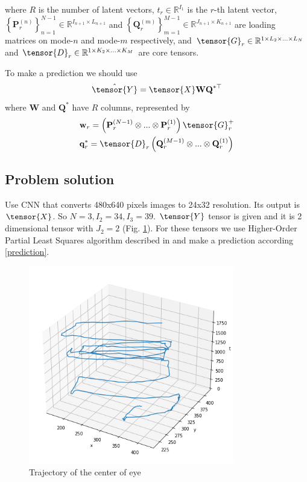 \documentclass[../../main.tex]{subfiles}
\begin{document}
\noindent where $R$ is the number of latent vectors, $t_r \in \mathbb{R}^{I_1}$ is the $r$-th latent vector, $\left\{\textbf{P}_r^{(n)}\right\}_{n=1}^{N-1} \in \mathbb{R}^{I_{n+1} \times L_{n+1}}$ and 
$\left\{\textbf{Q}_r^{(m)}\right\}_{m=1}^{M-1} \in \mathbb{R}^{J_{n+1} \times K_{n+1}}$
are loading matrices on mode-$n$ and mode-$m$ respectively, and $\tensor{G}_r \in \mathbb{R}^{1 \times L_2 \times ... \times L_N}$ and $\tensor{D}_r \in \mathbb{R}^{1 \times K_2 \times ... \times K_M}$ are core tensors.

To make a prediction we should use 
\begin{equation}
    \label{prediction}
    \hat{\tensor{Y}} = \tensor{X} \textbf{W} \textbf{Q}^{* \top}
\end{equation}
where $\textbf{W}$ and $\textbf{Q}^{*}$ have $R$ columns, represented by
\begin{equation}
    \begin{split}
        & \textbf{w}_r = \left( \textbf{P}_r^{(N-1)} \otimes ... \otimes \textbf{P}_r^{(1)} \right) \tensor{G}_{r}^+ \\
        & \textbf{q}^*_r = \tensor{D}_{r} \left( \textbf{Q}_r^{(M-1)} \otimes ... \otimes \textbf{Q}_r^{(1)} \right)
    \end{split}
\end{equation}

\subsection{Problem solution}

Use CNN that converts 480x640 pixels images to 24x32 resolution. Its output is $\tensor{X}$. So $N = 3, I_2 = 34, I_3 = 39$. $\tensor{Y}$ tensor is given and it is 2 dimensional tensor with $J_2 = 2$ (Fig. \ref{fig:eye_pred:2}). For these tensors we use Higher-Order Partial Least Squares algorithm described in \cite{HOPLS} and make a prediction according \eqref{prediction}. 

\begin{figure}[h!]
\centering
\includegraphics[width=0.8\textwidth]{figures/trajectory}
\caption{Trajectory of the center of eye}
\label{fig:eye_pred:2}
\end{figure}
\end{document}
